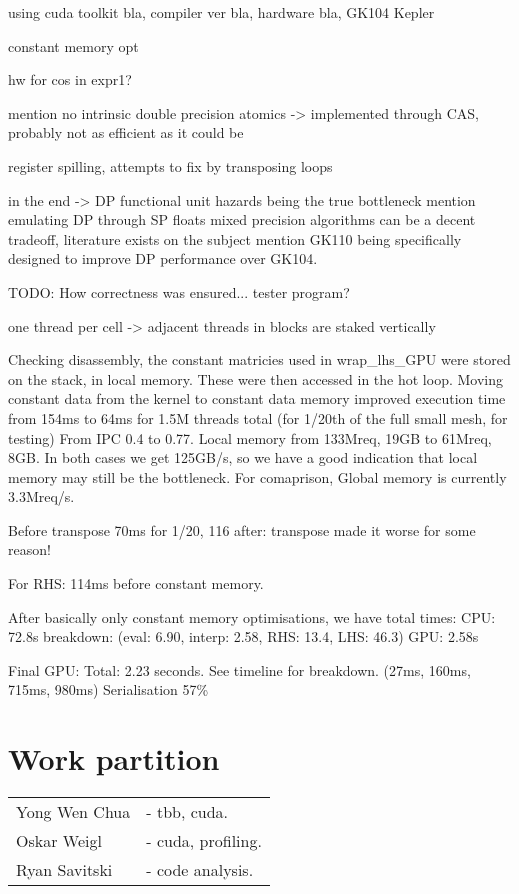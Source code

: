 \documentclass[11pt, oneside, a4paper]{article}
\begin{document}
using cuda toolkit bla, compiler ver bla, hardware bla, GK104 Kepler

constant memory opt

hw for cos in expr1? 

mention no intrinsic double precision atomics -> implemented through CAS, probably not as efficient as it could be

register spilling, attempts to fix by transposing loops

in the end -> DP functional unit hazards being the true bottleneck
mention emulating DP through SP floats
mixed precision algorithms can be a decent tradeoff, literature exists on the subject
mention GK110 being specifically designed to improve DP performance over GK104.

TODO: How correctness was ensured... tester program?

one thread per cell -> adjacent threads in blocks are staked vertically

Checking disassembly, the constant matricies used in wrap\_lhs\_GPU were stored on the stack, in local memory. These were then accessed in the hot loop.
Moving constant data from the kernel to constant data memory improved execution time from 154ms to 64ms for 1.5M threads total (for 1/20th of the full small mesh, for testing)
From IPC 0.4 to 0.77.
Local memory from 133Mreq, 19GB to 61Mreq, 8GB.
In both cases we get 125GB/s, so we have a good indication that local memory may still be the bottleneck.
For comaprison, Global memory is currently 3.3Mreq/s.

Before transpose 70ms for 1/20, 116 after: transpose made it worse for some reason!

For RHS: 114ms before constant memory.

After basically only constant memory optimisations, we have total times:
CPU: 72.8s breakdown: (eval: 6.90, interp: 2.58, RHS: 13.4, LHS: 46.3)
GPU: 2.58s


Final GPU:
Total: 2.23 seconds. See timeline for breakdown. (27ms, 160ms, 715ms, 980ms)
Serialisation 57\%



\section{Work partition} %
\label{sec:work_partition}
\begin{tabular}{ l l  }
Yong Wen Chua & - tbb, cuda. \\
Oskar Weigl & - cuda, profiling. \\
Ryan Savitski & - code analysis. \\
\end{tabular}
\end{document}
